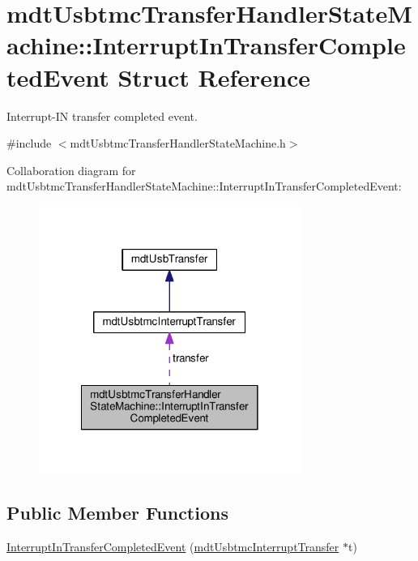 \hypertarget{structmdt_usbtmc_transfer_handler_state_machine_1_1_interrupt_in_transfer_completed_event}{\section{mdt\-Usbtmc\-Transfer\-Handler\-State\-Machine\-:\-:Interrupt\-In\-Transfer\-Completed\-Event Struct Reference}
\label{structmdt_usbtmc_transfer_handler_state_machine_1_1_interrupt_in_transfer_completed_event}
}


Interrupt-\/\-I\-N transfer completed event.  




{\ttfamily \#include $<$mdt\-Usbtmc\-Transfer\-Handler\-State\-Machine.\-h$>$}



Collaboration diagram for mdt\-Usbtmc\-Transfer\-Handler\-State\-Machine\-:\-:Interrupt\-In\-Transfer\-Completed\-Event\-:\nopagebreak
\begin{figure}[H]
\begin{center}
\leavevmode
\includegraphics[width=242pt]{structmdt_usbtmc_transfer_handler_state_machine_1_1_interrupt_in_transfer_completed_event__coll__graph}
\end{center}
\end{figure}
\subsection*{Public Member Functions}
\begin{DoxyCompactItemize}
\item 
\hyperlink{structmdt_usbtmc_transfer_handler_state_machine_1_1_interrupt_in_transfer_completed_event_a04e328b62d4f4cc0aca58756708b0019}{Interrupt\-In\-Transfer\-Completed\-Event} (\hyperlink{classmdt_usbtmc_interrupt_transfer}{mdt\-Usbtmc\-Interrupt\-Transfer} $\ast$t)
\end{DoxyCompactItemize}
